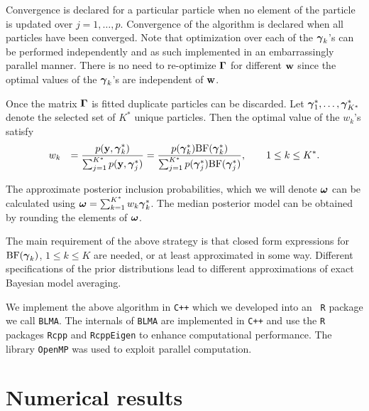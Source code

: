  Convergence is declared for a particular particle when no element of
the particle is updated over $j=1,\ldots,p$. Convergence of the algorithm is
declared when all particles have been converged. Note that optimization over
each of the ${\boldsymbol \gamma}_k$'s can be performed independently and as such
implemented in an embarrassingly parallel manner.  There is no need to
re-optimize ${\boldsymbol \Gamma}$ for different ${\bf w}$ since  the optimal values of the
${\boldsymbol \gamma}_k$'s are independent of ${\bf w}$.

Once the matrix ${\boldsymbol \Gamma}$ is fitted duplicate particles can be discarded.  Let
${{\boldsymbol \gamma}}_1^*,\ldots,{{\boldsymbol \gamma}}_{K^*}^*$ denote the selected set of $K^*$
unique particles. Then the optimal value of the $w_k$'s satisfy
\begin{equation}
\label{eq:updateW}
\begin{array}{rl}
\displaystyle w_k 
& \displaystyle = \frac{\displaystyle p({\bf y},{\boldsymbol \gamma}_k^*)}{\sum_{j=1}^{K^*} p({\bf y},{\boldsymbol \gamma}_j^*)}
= \frac{p({\boldsymbol \gamma}_k^*)\mbox{BF}({\boldsymbol \gamma}_k^*)
}{\sum_{j=1}^{K^*}
	p({\boldsymbol \gamma}_j^*)\mbox{BF}({\boldsymbol \gamma}_j^*)
}, \qquad 1\le k\le K^*.
\end{array}
\end{equation}

\noindent The approximate posterior inclusion probabilities, which we will
denote ${\boldsymbol \omega}$ can be calculated using ${\boldsymbol \omega} = \sum_{k=1}^{K^*} w_k
{\boldsymbol \gamma}_k^*$.  The median posterior model can be obtained by rounding the
elements of ${\boldsymbol \omega}$.

The main requirement of the above strategy is that closed form expressions for
$\mbox{BF}({\boldsymbol \gamma}_k)$, $1\le k\le K$ are needed, or at least approximated in
some way.  Different specifications of the prior distributions lead to
different approximations of exact Bayesian model averaging.

We implement the above algorithm in {\tt C++} which we developed into an {\tt
R} package we call  {\tt BLMA}.  The internals of {\tt BLMA} are implemented in
{\tt C++} and use the {\tt R} packages \texttt{Rcpp} and \texttt{RcppEigen} to
enhance computational performance. The library {\tt OpenMP} was used to exploit
parallel computation.

\section{Numerical results}
\label{sec:numerical}

